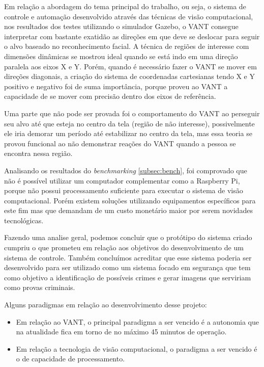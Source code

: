 Em relação a abordagem do tema principal do trabalho, ou seja, o sistema de controle e automação desenvolvido através das técnicas de visão computacional, nos resultados dos testes utilizando o simulador Gazebo, o VANT consegue interpretar com bastante exatidão as direções em que deve se deslocar para seguir o alvo baseado no reconhecimento facial. A técnica de regiões de interesse com dimensões dinâmicas se mostrou ideal quando se está indo em uma direção paralela aos eixos X e Y. Porém, quando é necessário fazer o VANT se mover em direções diagonais, a criação do sistema de coordenadas cartesianas tendo X e Y positivo e negativo foi de suma importância, porque proveu ao VANT a capacidade de se mover com precisão dentro dos eixos de referência.

Uma parte que não pode ser provada foi o comportamento do VANT ao perseguir seu alvo até que esteja no centro da tela (região de não interesse), possivelmente ele iria demorar um período até estabilizar no centro da tela, mas essa teoria se provou funcional ao não demonstrar reações do VANT quando a pessoa se encontra nessa região. 

Analisando os resultados do \textit{benchmarking} \ref{subsec:bench}, foi comprovado que não é possível utilizar um computador complementar como a Raspberry Pi, porque não possui processamento suficiente para executar o sistema de visão computacional. Porém existem soluções utilizando equipamentos específicos para este fim mas que demandam de um custo monetário maior por serem novidades tecnológicas.

Fazendo uma analise geral, podemos concluir que o protótipo do sistema criado cumpriu o que prometeu em relação aos objetivos do desenvolvimento de um sistema de controle. Também concluímos acreditar que esse sistema poderia ser desenvolvido para ser utilizado como um sistema focado em segurança que tem como objetivo a identificação de possíveis crimes e gerar imagens que serviriam como provas criminais. 

Alguns paradigmas em relação ao desenvolvimento desse projeto:

\begin{itemize}
	\item Em relação ao VANT, o principal paradigma a ser vencido é a autonomia que na atualidade fica em torno de no máximo 45 minutos de operação.
	\item Em relação a tecnologia de visão computacional, o paradigma a ser vencido é o de capacidade de processamento.
\end{itemize}

